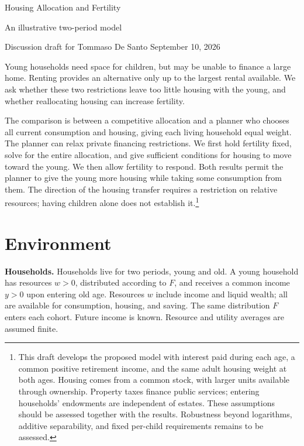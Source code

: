 \documentclass[11pt]{article}
\begin{document}
\begin{center}
{\Large Housing Allocation and Fertility}\par
\smallskip
{\large An illustrative two-period model}\par
\smallskip
{\small Discussion draft for Tommaso De Santo \quad September 10, 2026}
\end{center}
\medskip

Young households need space for children, but may be unable to finance a large
home. Renting provides an alternative only up to the largest rental available.
We ask whether these two restrictions leave too little housing with the young,
and whether reallocating housing can increase fertility.

The comparison is between a competitive allocation and a planner who chooses
all current consumption and housing, giving each living household equal
weight. The planner can relax private financing restrictions. We first hold
fertility fixed, solve for the entire allocation, and give sufficient
conditions for housing to move toward the young. We then allow fertility to
respond. Both results permit the planner to give the young more housing while
taking some consumption from them. The direction of the housing transfer
requires a restriction on relative resources; having children alone does not
establish it.\footnote{This draft develops the proposed model with interest
paid during each age, a common positive retirement income, and the same adult
housing weight at both ages. Housing comes from a common stock, with larger
units available through ownership. Property taxes finance public services;
entering households' endowments are independent of estates. These assumptions
should be assessed together with the results. Robustness beyond logarithms, additive
separability, and fixed per-child requirements remains to be assessed.}

\section{Environment}

\textbf{Households.} Households live for two periods, young and old. A young
household has resources $w>0$, distributed according to $F$, and receives a
common income $y>0$ upon entering old age. Resources $w$ include income and
liquid wealth; all are available for consumption, housing, and saving. The
same distribution $F$ enters each cohort. Future income is known. Resource
and utility averages are assumed finite.
\end{document}
